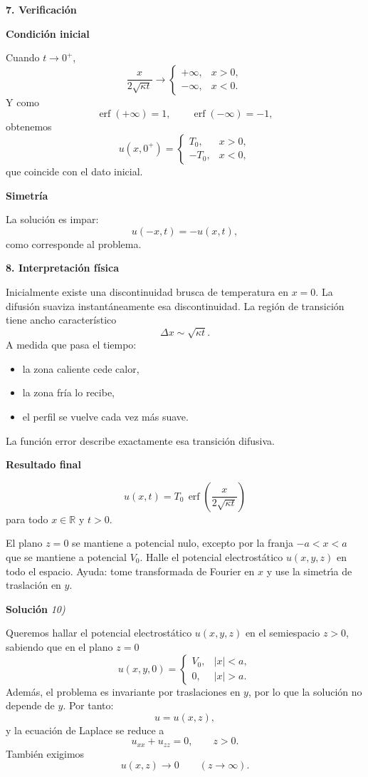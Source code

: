 \documentclass[11pt,spanish]{article}
\newcounter{problema}
\newcommand{\prob}{\stepcounter{problema} \vspace{.5cm} \noindent{\bf Problema \arabic{problema}: }}
\begin{document}
{\bf 7. Verificación}

{\bf Condición inicial}

Cuando $t\to0^+$,
$$
\frac{x}{2\sqrt{\kappa t}}
\to
\begin{cases}
+\infty,& x>0,\\
-\infty,& x<0.
\end{cases}
$$
Y como
$$
\operatorname{erf}(+\infty)=1,
\qquad
\operatorname{erf}(-\infty)=-1,
$$
obtenemos
$$
u(x,0^+)
=
\begin{cases}
T_0,& x>0,\\
-T_0,& x<0,
\end{cases}
$$
que coincide con el dato inicial.

{\bf Simetría}

La solución es impar:
$$
u(-x,t)=-u(x,t),
$$
como corresponde al problema.

{\bf 8. Interpretación física}

Inicialmente existe una discontinuidad brusca de temperatura en $x=0$.
La difusión suaviza instantáneamente esa discontinuidad.
La región de transición tiene ancho característico
$$
\boxed{
\Delta x \sim \sqrt{\kappa t}.
}
$$
A medida que pasa el tiempo:
\begin{itemize}
\item la zona caliente cede calor,
\item la zona fría lo recibe,
\item el perfil se vuelve cada vez más suave.
\end{itemize}
La función error describe exactamente esa transición difusiva.

{\bf Resultado final}

$$
\boxed{
u(x,t)
=
T_0\,
\operatorname{erf}
\left(
\frac{x}{2\sqrt{\kappa t}}
\right)
}
$$
para todo $x\in\mathbb R$ y $t>0$.




\prob El plano \(z=0\) se mantiene a potencial nulo, excepto por la franja \(-a<x<a\) que se mantiene a potencial \(V_0\). Halle el potencial electrostático \(u(x,y,z)\) en todo el espacio. Ayuda: tome transformada de Fourier en \(x\) y use la simetr\'{\i}a de traslaci\'on en $y$.

\vspace{0.5cm}
{\bf Soluci\'on }{\em 10)}
\vspace{0.5cm}

Queremos hallar el potencial electrostático $u(x,y,z)$ en el semiespacio $z>0$, sabiendo que en el plano $z=0$
$$
u(x,y,0)=
\begin{cases}
V_0,& |x|<a,\\
0,& |x|>a.
\end{cases}
$$
Además, el problema es invariante por traslaciones en $y$, por lo que la solución no depende de $y$. 
Por tanto:
$$
u=u(x,z),
$$
y la ecuación de Laplace se reduce a
$$
u_{xx}+u_{zz}=0,
\qquad z>0.
$$
También exigimos
$$
u(x,z)\to0
\qquad
(z\to\infty).
$$
\end{document}
